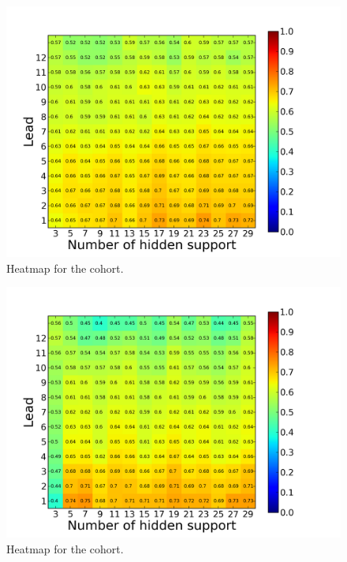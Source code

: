 \begin{figure}[ht!]
  \caption{Heatmap for the \forum cohort.}\label{fig:hmm_heatmap_forum_only}
  \centering
    \includegraphics[width=1.0\textwidth]{figures/hmm/forum_only.png}
\end{figure}

\begin{figure}[ht!]
  \caption{Heatmap for the \both cohort.}\label{fig:hmm_heatmap_forum_and_wiki}
  \centering
    \includegraphics[width=1.0\textwidth]{figures/hmm/forum_and_wiki.png}
\end{figure}


